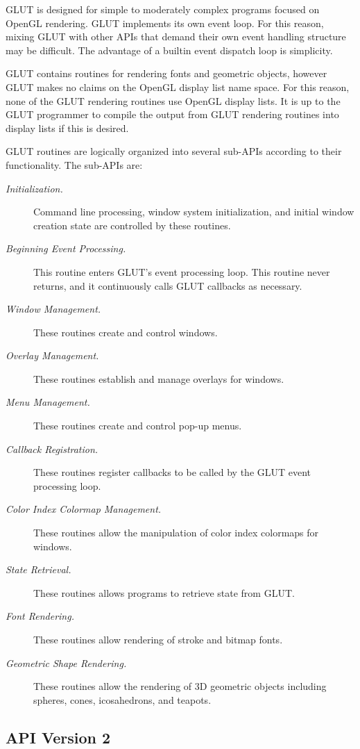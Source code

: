 \documentclass[titlepage,twoside]{article}
\begin{document}
GLUT is designed for simple to moderately complex programs focused on
OpenGL rendering.  GLUT implements its own event loop.  For this
reason, mixing GLUT with other APIs that demand their own event
handling structure may be difficult.  The advantage of a builtin event
dispatch loop is simplicity.

GLUT contains routines for rendering fonts and geometric objects,
however GLUT makes no claims on the OpenGL display list name space.
For this reason, none of the GLUT rendering routines use OpenGL display
lists.  It is up to the GLUT programmer to compile the output from GLUT
rendering routines into display lists if this is desired.

GLUT routines are logically organized into several sub-APIs according
to their functionality.  The sub-APIs are:
\begin{description}
\item[{\em Initialization.}]
Command line processing,
window system initialization, and initial window creation state are controlled
by these routines.
\item[{\em Beginning Event Processing.}]
This routine enters GLUT's event processing loop.  This routine never returns,
and it continuously calls GLUT callbacks as necessary.
\item[{\em Window Management.}]
These routines create and control windows.
\item[{\em Overlay Management.}]
These routines establish and manage overlays for windows.
\item[{\em Menu Management.}]
These routines create and control pop-up menus.
\item[{\em Callback Registration.}]
These routines register callbacks to be called by the GLUT event processing loop.
\item[{\em Color Index Colormap Management.}]
These routines allow the manipulation of color index colormaps for windows.
\item[{\em State Retrieval.}]
These routines allows programs to retrieve state from GLUT.
\item[{\em Font Rendering.}]
These routines allow rendering of stroke and bitmap fonts.
\item[{\em Geometric Shape Rendering.}]
These routines allow the rendering of 3D geometric objects including spheres,
cones, icosahedrons, and teapots.
\end{description}

\subsection{API Version 2}
\end{document}
